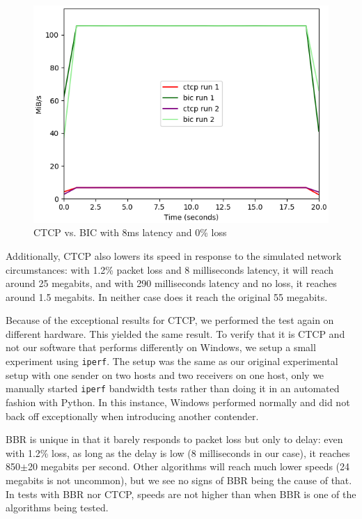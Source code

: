 \documentclass{article}
\begin{document}
\begin{figure}[H]
	\centering
		\includegraphics[scale=0.4]{figs/ctcp-bic-8-0.png}
		\caption{CTCP vs. BIC with 8ms latency and 0\% loss}
	\label{fig:ctcp-1}
\end{figure}

Additionally, CTCP also lowers its speed in response to the simulated network
circumstances: with 1.2\% packet loss and 8 milliseconds latency, it will reach
around 25 megabits, and with 290 milliseconds latency and no loss, it reaches
around 1.5 megabits. In neither case does it reach the original 55 megabits.

Because of the exceptional results for CTCP, we performed the test again on
different hardware. This yielded the same result. To verify that it is CTCP and
not our software that performs differently on Windows, we setup a small
experiment using \texttt{iperf}. The setup was the same as our original
experimental setup with one sender on two hosts and two receivers on one host,
only we manually started \texttt{iperf} bandwidth tests rather than doing it in
an automated fashion with Python. In this instance, Windows performed normally
and did not back off exceptionally when introducing another contender.

BBR is unique in that it barely responds to packet loss but only to delay: even
with 1.2\% loss, as long as the delay is low (8 milliseconds in our case), it
reaches 850$\pm$20 megabits per second. Other algorithms will reach much lower
speeds (24 megabits is not uncommon), but we see no signs of BBR being the
cause of that. In tests with BBR nor CTCP, speeds are not higher than when BBR
is one of the algorithms being tested.
\end{document}
